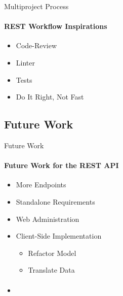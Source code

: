     \begin{frame}[t]{Multiproject Process}\framesubtitle{REST Workflow Inspirations}
        \begin{itemize}
            \item Code-Review
            \item Linter
            \item Tests
            \item Do It Right, Not Fast
        \end{itemize}
    \end{frame}

    \subsection{Future Work}
    \begin{frame}[t]{Future Work}\framesubtitle{Future Work for the REST API}
        \begin{itemize}            
            \item More Endpoints
            \item Standalone Requirements
            \item Web Administration
            \item Client-Side Implementation
            \begin{itemize}
                \item Refactor Model
                \item Translate Data
            \end{itemize}
        \end{itemize}
    \end{frame}

    \begin{frame}[t]{}\framesubtitle{}
        \begin{itemize} 
            \item
        \end{itemize}
    \end{frame}